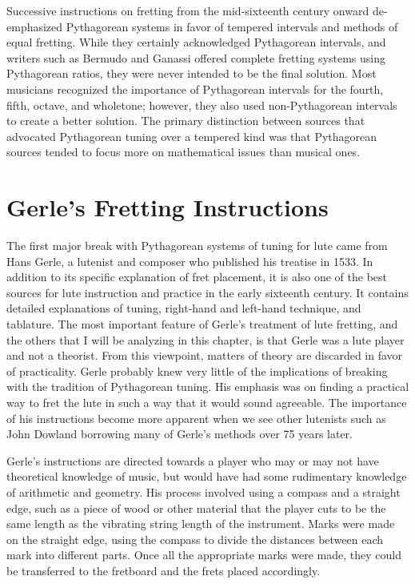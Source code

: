 Successive instructions on fretting from the mid-sixteenth century onward de-emphasized Pythagorean
systems in favor of tempered intervals and methods of equal fretting. While they certainly
acknowledged Pythagorean intervals, and writers such as Bermudo and Ganassi offered complete
fretting systems using Pythagorean ratios, they were never intended to be the final solution. Most
musicians recognized the importance of Pythagorean intervals for the fourth, fifth, octave, and
wholetone; however, they also used non-Pythagorean intervals to create a better solution.  The
primary distinction between sources that advocated Pythagorean tuning over a tempered kind was that
Pythagorean sources tended to focus more on mathematical issues than musical ones.


%
%
\section{Gerle's Fretting Instructions}

The first major break with Pythagorean systems of tuning for lute came from Hans Gerle, a
lutenist and composer who published his treatise in 1533.  In addition to its specific
explanation of fret placement, it is also one of the best sources for lute instruction and
practice in the early sixteenth century.  It contains detailed explanations of tuning,
right-hand and left-hand technique, and tablature.  The most important feature of
Gerle's treatment of lute fretting, and the others that I will be analyzing in this
chapter, is that Gerle was a lute player and not a theorist. From this viewpoint, matters
of theory are discarded in favor of practicality.  Gerle probably knew very little of the
implications of breaking with the tradition of Pythagorean tuning.  His emphasis was on
finding a practical way to fret the lute in such a way that it would sound agreeable.  The
importance of his instructions become more apparent when we see other lutenists such as
John Dowland borrowing many of Gerle's methods over 75 years later.

Gerle's instructions are directed towards a player who may or may not have theoretical
knowledge of music, but would have had some rudimentary knowledge of arithmetic and
geometry.  His process involved using a compass and a straight edge, such as a piece of
wood or other material that the player cuts to be the same length as the vibrating string
length of the instrument.  Marks were made on the straight edge, using the compass to
divide the distances between each mark into different parts.  Once all the appropriate
marks were made, they could be transferred to the fretboard and the frets placed
accordingly.

